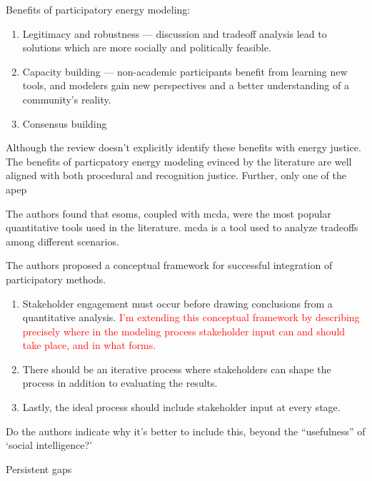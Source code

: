 Benefits of participatory energy modeling:
\begin{enumerate}
    \item Legitimacy and robustness --- discussion and tradeoff analysis lead to
    solutions which are more socially and politically feasible.
    \item Capacity building --- non-academic participants benefit from learning new
    tools, and modelers gain new perspectives and a better understanding of a community's
    reality.
    \item Consensus building 
\end{enumerate}

Although the review doesn't explicitly identify these benefits with energy justice.
The benefits of particpatory energy modeling evinced by the literature are well 
aligned with both procedural and recognition justice. Further, only one of the apep


The authors found that \acp{esom}, coupled with \ac{mcda}, were the most popular 
quantitative tools used in the literature. \Ac{mcda} is a tool used to analyze 
tradeoffs among different scenarios. 

The authors proposed a conceptual framework for successful integration of 
participatory methods.
\begin{enumerate}
    \item Stakeholder engagement must occur before drawing conclusions from a
    quantitative analysis. \textcolor{red}{I'm extending this conceptual framework
    by describing precisely where in the modeling process stakeholder input can 
    and should take place, and in what forms.}
    \item There should be an iterative process where stakeholders can shape the 
    process in addition to evaluating the results.
    \item Lastly, the ideal process should include stakeholder input at every stage.
\end{enumerate}
Do the authors indicate why it's better to include this, beyond the ``usefulness''
of `social intelligence?'


Persistent gaps

